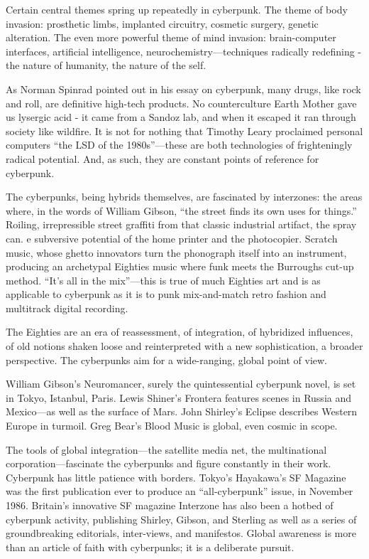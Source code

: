 Certain central themes spring up repeatedly in cyberpunk. The theme of body invasion: prosthetic limbs, implanted circuitry, cosmetic surgery, genetic alteration. The even more powerful theme of mind invasion: brain-computer interfaces, artificial intelligence, neurochemistry---techniques radically redefining - the nature of humanity, the nature of the self.

As Norman Spinrad pointed out in his essay on cyberpunk, many drugs, like rock and roll, are definitive high-tech products. No counterculture Earth Mother gave us lysergic acid - it came from a Sandoz lab, and when it escaped it ran through society like wildfire. It is not for nothing that Timothy Leary proclaimed personal computers ``the LSD of the 1980s''---these are both technologies of frighteningly radical potential. And, as such, they are constant points of reference for cyberpunk.

The cyberpunks, being hybrids themselves, are fascinated by interzones: the areas where, in the words of William Gibson, ``the street finds its own uses for things.'' Roiling, irrepressible street graffiti from that classic industrial artifact, the spray can. e subversive potential of the home printer and the photocopier. Scratch music, whose ghetto innovators turn the phonograph itself into an instrument, producing an archetypal Eighties music where funk meets the Burroughs cut-up method. ``It's all in the mix''---this is true of much Eighties art and is as applicable to cyberpunk as it is to punk mix-and-match retro fashion and multitrack digital recording.

The Eighties are an era of reassessment, of integration, of hybridized influences, of old notions shaken loose and reinterpreted with a new sophistication, a broader perspective. The cyberpunks aim for a wide-ranging, global point of view.

William Gibson's Neuromancer, surely the quintessential cyberpunk novel, is set in Tokyo, Istanbul, Paris. Lewis Shiner's Frontera features scenes in Russia and Mexico---as well as the surface of Mars. John Shirley's Eclipse describes Western Europe in turmoil. Greg Bear's Blood Music is global, even cosmic in scope.

The tools of global integration---the satellite media net, the multinational corporation---fascinate the cyberpunks and figure constantly in their work. Cyberpunk has little patience with borders. Tokyo's Hayakawa's SF Magazine was the first publication ever to produce an ``all-cyberpunk'' issue, in November 1986. Britain's innovative SF magazine Interzone has also been a hotbed of cyberpunk activity, publishing Shirley, Gibson, and Sterling as well as a series of groundbreaking editorials, inter-views, and manifestos. Global awareness is more than an article of faith with cyberpunks; it is a deliberate pursuit.


